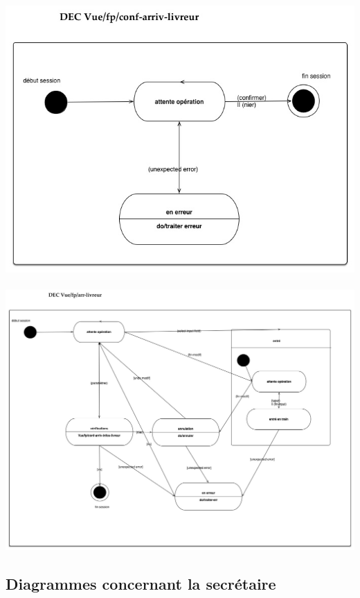 \documentclass{report}
\begin{document}
\includegraphics[scale = 0.75]{images/dec-livreur-conf-arrive.jpg}

\paragraph{}

\includegraphics[scale = 0.5, angle = 90]{images/dec-livreur-infos.jpg}

\subsection{Diagrammes concernant la secrétaire}
\end{document}
